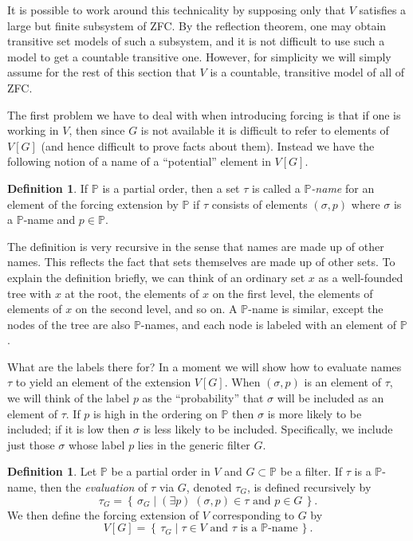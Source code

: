 \documentclass[11pt,oneside]{amsbook}
\newcommand{\set}[1]{\left\{\,#1\,\right\}}
\newcommand{\PP}{\mathbb P}
\theoremstyle{definition}
\theoremstyle{plain}
\theoremstyle{definition}
\newtheorem{definition}[theorem]{Definition}
\theoremstyle{remark}
\numberwithin{equation}{section}
\numberwithin{figure}{section}
\begin{document}
It is possible to work around this technicality by supposing only that $V$ satisfies a large but finite subsystem of ZFC. By the reflection theorem, one may obtain transitive set models of such a subsystem, and it is not difficult to use such a model to get a countable transitive one. However, for simplicity we will simply assume for the rest of this section that $V$ is a countable, transitive model of all of ZFC.


The first problem we have to deal with when introducing forcing is that if one is working in $V$, then since $G$ is not available it is difficult to refer to elements of $V[G]$ (and hence difficult to prove facts about them). Instead we have the following notion of a name of a ``potential'' element in $V[G]$.

\begin{definition}
  If $\PP$ is a partial order, then a set $\tau$ is called a \emph{$\PP$-name} for an element of the forcing extension by $\mathbb P$ if $\tau$ consists of elements $(\sigma,p)$ where $\sigma$ is a \emph{$\PP$}-name and $p\in\PP$.
\end{definition}

The definition is very recursive in the sense that names are made up of other names. This reflects the fact that sets themselves are made up of other sets. To explain the definition briefly, we can think of an ordinary set $x$ as a well-founded tree with $x$ at the root, the elements of $x$ on the first level, the elements of elements of $x$ on the second level, and so on. A $\PP$-name is similar, except the nodes of the tree are also $\PP$-names, and each node is labeled with an element of $\PP$.

What are the labels there for? In a moment we will show how to evaluate names $\tau$ to yield an element of the extension $V[G]$. When $(\sigma,p)$ is an element of $\tau$, we will think of the label $p$ as the ``probability'' that $\sigma$ will be included as an element of $\tau$. If $p$ is high in the ordering on $\PP$ then $\sigma$ is more likely to be included; if it is low then $\sigma$ is less likely to be included. Specifically, we include just those $\sigma$ whose label $p$ lies in the generic filter $G$.

\begin{definition}
  Let $\PP$ be a partial order in $V$ and $G\subset\PP$ be a filter. If $\tau$ is a $\PP$-name, then the \emph{evaluation} of $\tau$ via $G$, denoted $\tau_G$, is defined recursively by
  \[\tau_G=\set{\sigma_G\mid (\exists p)\;(\sigma,p)\in\tau\text{ and }p\in G}\text{.}
  \]
  We then define the forcing extension of $V$ corresponding to $G$ by
  \[V[G]=\set{\tau_G\mid\text{$\tau\in V$ and $\tau$ is a $\PP$-name}}\text{.}
  \]
\end{definition}
\end{document}
